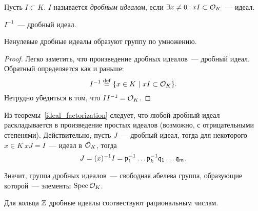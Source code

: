 	\begin{definition} 
		Пусть $I \subset K$. $I$ называется \emph{дробным идеалом}, если $\exists x \neq 0\colon x I \subset \mathcal{O}_{K}$~--- идеал.
	\end{definition}

	\begin{example}
		$I^{-1}$~--- дробный идеал. 
	\end{example}

	\begin{statement} 
		Ненулевые дробные идеалы образуют группу по умножению. 
	\end{statement}

	\begin{proof}
		Легко заметить, что произведение дробных идеалов~--- дробный идеал. Обратный определяется как и раньше:
		\[
			I^{-1} \stackrel{\mathrm{def}}{=} \{ x \in K \ \vert \ xI \subset \mathcal{O}_{K} \}.
		\]
		Нетрудно убедиться в том, что $I I^{-1} = \mathcal{O}_{K}$. 
	\end{proof}

	Из теоремы~\ref{ideal_factorization} следует, что любой дробный идеал раскладывается в произведение простых идеалов (возможно, с отрицательными степенями). Действительно, пусть $J$~--- дробный идеал, тогда для некоторого $x \in K \ xJ = I$~--- идеал в $\mathcal{O}_{K}$, тогда 
	\[
		J = (x)^{-1}I = \mathfrak{p}_{1}^{-1} \ldots \mathfrak{p}_{k}^{-1} \mathfrak{q}_{1}\ldots \mathfrak{q}_{m}.
	\]

	Значит, группа дробных идеалов~--- свободная абелева группа, образующие которой~--- элементы $\operatorname{Spec}{\mathcal{O}_{K}}$.

	\begin{example}
		Для кольца $\mathbb{Z}$ дробные идеалы соотвествуют рациональным числам. 
	\end{example}

